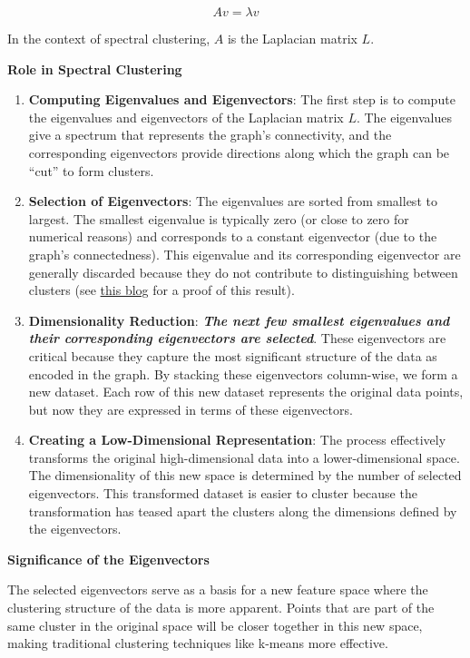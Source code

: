 \documentclass[11pt]{article}
\begin{document}
\[ A v = \lambda v \]

In the context of spectral clustering, \(A\) is the Laplacian matrix
\(L\).

    \textbf{Role in Spectral Clustering}

\begin{enumerate}
\def\labelenumi{\arabic{enumi}.}
\item
  \textbf{Computing Eigenvalues and Eigenvectors}: The first step is to
  compute the eigenvalues and eigenvectors of the Laplacian matrix
  \(L\). The eigenvalues give a spectrum that represents the graph's
  connectivity, and the corresponding eigenvectors provide directions
  along which the graph can be ``cut'' to form clusters.
\item
  \textbf{Selection of Eigenvectors}: The eigenvalues are sorted from
  smallest to largest. The smallest eigenvalue is typically zero (or
  close to zero for numerical reasons) and corresponds to a constant
  eigenvector (due to the graph's connectedness). This eigenvalue and
  its corresponding eigenvector are generally discarded because they do
  not contribute to distinguishing between clusters (see
  \href{https://medium.com/@roiyeho/spectral-clustering-50aee862d300}{this
  blog} for a proof of this result).
\item
  \textbf{Dimensionality Reduction}: \textbf{\emph{The next few smallest
  eigenvalues and their corresponding eigenvectors are selected}}. These
  eigenvectors are critical because they capture the most significant
  structure of the data as encoded in the graph. By stacking these
  eigenvectors column-wise, we form a new dataset. Each row of this new
  dataset represents the original data points, but now they are
  expressed in terms of these eigenvectors.
\item
  \textbf{Creating a Low-Dimensional Representation}: The process
  effectively transforms the original high-dimensional data into a
  lower-dimensional space. The dimensionality of this new space is
  determined by the number of selected eigenvectors. This transformed
  dataset is easier to cluster because the transformation has teased
  apart the clusters along the dimensions defined by the eigenvectors.
\end{enumerate}

    \textbf{Significance of the Eigenvectors}

The selected eigenvectors serve as a basis for a new feature space where
the clustering structure of the data is more apparent. Points that are
part of the same cluster in the original space will be closer together
in this new space, making traditional clustering techniques like k-means
more effective.
\end{document}
